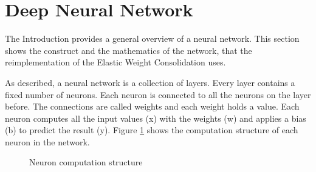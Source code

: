 \section{Deep Neural Network}
\label{foundations_deep_neural_network}

The Introduction provides a general overview of a neural network.
This section shows the construct and the mathematics of the network, that the reimplementation of the Elastic Weight Consolidation uses.

As described, a neural network is a collection of layers.
Every layer contains a fixed number of neurons.
Each neuron is connected to all the neurons on the layer before.
The connections are called weights and each weight holds a value.
\newline
Each neuron computes all the input values (x) with the weights (w) and applies a bias (b) to predict the result (y).
Figure \ref{fig:dnn_node_procedure} shows the computation structure of each neuron in the network.
\cite{math_nn_skalski}

\begin{figure}[H]
    \centering
    \caption{\cite{dnn_neuron_basic_overview} Neuron computation structure}
    \label{fig:dnn_node_procedure}
\end{figure}

